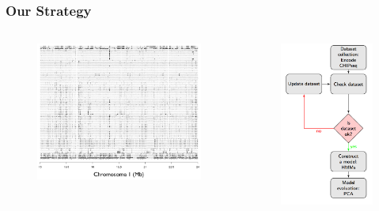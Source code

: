 \documentclass{beamer}
\begin{document}
\begin{frame}
	\frametitle{Our Strategy}
	\begin{columns}
 		\begin{column}{.48\textwidth}
			\begin{figure}
				\includegraphics[width=1.\textwidth]{figs/mat}
			\end{figure}
		\end{column}
		\pause
 		\begin{column}{.48\textwidth}
			\begin{figure}
				\includegraphics[width=.7\textwidth]{figs/strategy}
			\end{figure}
		\end{column}
	

\end{columns}
\end{frame}
\end{document}
